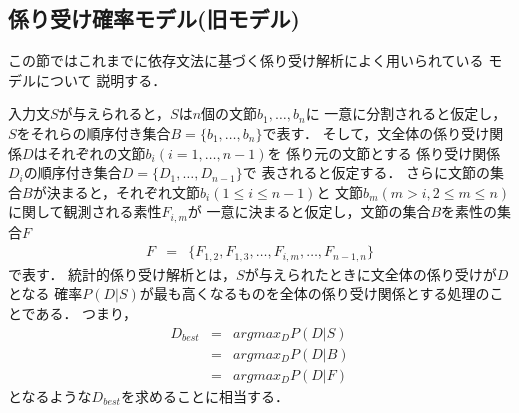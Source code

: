 \subsection{係り受け確率モデル(旧モデル)}
\label{sec:old_model}

この節ではこれまでに依存文法に基づく係り受け解析によく用いられている
モデル\cite{collins:acl96,fujio:nl97,Haruno:ipsj98,Uchimoto:ipsj99}について
説明する．

入力文$S$が与えられると，$S$は$n$個の文節$b_{1}, \ldots, b_{n}$に
一意に分割されると仮定し，
$S$をそれらの順序付き集合$B = \{b_{1}, \ldots, b_{n}\}$で表す．
そして，文全体の係り受け関係$D$はそれぞれの文節$b_{i} (i=1,\ldots,n-1)$を
係り元の文節とする
係り受け関係$D_{i}$の順序付き集合$D = \{D_{1},\ldots,D_{n-1}\}$で
表されると仮定する．
さらに文節の集合$B$が決まると，それぞれ文節$b_{i}(1\leq i\leq n-1)$と
文節$b_{m} (m>i,2\leq m\leq n)$に関して観測される素性$F_{i,m}$が
一意に決まると仮定し，文節の集合$B$を素性の集合$F$
\begin{eqnarray}
  \label{eq:b}
  F & = & \{F_{1,2},F_{1,3},\ldots,F_{i,m},\ldots,F_{n-1,n}\}
\end{eqnarray}
で表す．
統計的係り受け解析とは，$S$が与えられたときに文全体の係り受けが$D$となる
確率$P(D|S)$が最も高くなるものを全体の係り受け関係とする処理のことである．
つまり，
\begin{eqnarray}
  \label{eq:d_best}
  D_{best} & = & argmax_{D}P(D|S) \nonumber\\
  & = & argmax_{D} P(D|B)\nonumber\\
  & = & argmax_{D} P(D|F)
\end{eqnarray}
となるような$D_{best}$を求めることに相当する．

